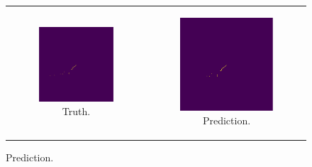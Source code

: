 \begin{figure}
	\begin{tabularx}{\textwidth}{cc}
		\begin{subfigure}[b]{0.49\textwidth}
			\centering
			\vspace{3mm}
			\includegraphics[width=\textwidth]{figures/unet_example_true.pdf}
			\caption {Truth.}
			\label{fig:unet_example_true}
		\end{subfigure} & 
		\begin{subfigure}[b]{0.49\textwidth}
			\centering
			\vspace{3mm}
			\includegraphics[width=\textwidth]{figures/unet_example_pred.pdf}
			\caption {Prediction.}
			\label{fig:unet_example_pred}
		\end{subfigure}
	\end{tabularx}


\end{figure}
